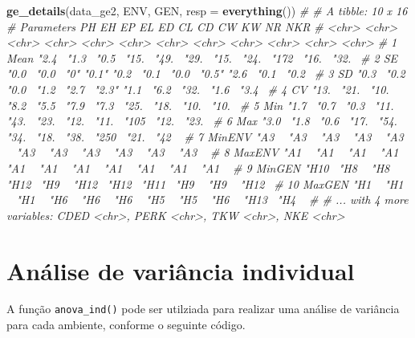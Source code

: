 \documentclass[
]{book}
\newenvironment{Shaded}{\begin{snugshade}}{\end{snugshade}}
\newcommand{\CommentTok}[1]{\textcolor[rgb]{0.56,0.35,0.01}{\textit{#1}}}
\newcommand{\DataTypeTok}[1]{\textcolor[rgb]{0.13,0.29,0.53}{#1}}
\newcommand{\KeywordTok}[1]{\textcolor[rgb]{0.13,0.29,0.53}{\textbf{#1}}}
\newcommand{\NormalTok}[1]{#1}
\begin{document}
\begin{Shaded}
\begin{Highlighting}[]
\KeywordTok{ge_details}\NormalTok{(data_ge2, ENV, GEN, }\DataTypeTok{resp =} \KeywordTok{everything}\NormalTok{())}
\CommentTok{# # A tibble: 10 x 16}
\CommentTok{#    Parameters PH    EH    EP    EL    ED    CL    CD    CW    KW    NR    NKR  }
\CommentTok{#    <chr>      <chr> <chr> <chr> <chr> <chr> <chr> <chr> <chr> <chr> <chr> <chr>}
\CommentTok{#  1 Mean       "2.4~ "1.3~ "0.5~ "15.~ "49.~ "29.~ "15.~ "24.~ "172~ "16.~ "32.~}
\CommentTok{#  2 SE         "0.0~ "0.0~ "0"   "0.1" "0.2~ "0.1~ "0.0~ "0.5" "2.6~ "0.1~ "0.2~}
\CommentTok{#  3 SD         "0.3~ "0.2~ "0.0~ "1.2~ "2.7~ "2.3" "1.1~ "6.2~ "32.~ "1.6~ "3.4~}
\CommentTok{#  4 CV         "13.~ "21.~ "10.~ "8.2~ "5.5~ "7.9~ "7.3~ "25.~ "18.~ "10.~ "10.~}
\CommentTok{#  5 Min        "1.7~ "0.7~ "0.3~ "11.~ "43.~ "23.~ "12.~ "11.~ "105~ "12.~ "23.~}
\CommentTok{#  6 Max        "3.0~ "1.8~ "0.6~ "17.~ "54.~ "34.~ "18.~ "38.~ "250~ "21.~ "42 ~}
\CommentTok{#  7 MinENV     "A3 ~ "A3 ~ "A3 ~ "A3 ~ "A3 ~ "A3 ~ "A3 ~ "A3 ~ "A3 ~ "A3 ~ "A3 ~}
\CommentTok{#  8 MaxENV     "A1 ~ "A1 ~ "A1 ~ "A1 ~ "A1 ~ "A1 ~ "A1 ~ "A1 ~ "A1 ~ "A1 ~ "A1 ~}
\CommentTok{#  9 MinGEN     "H10~ "H8 ~ "H8 ~ "H12~ "H9 ~ "H12~ "H12~ "H11~ "H9 ~ "H9 ~ "H12~}
\CommentTok{# 10 MaxGEN     "H1 ~ "H1 ~ "H1 ~ "H6 ~ "H6 ~ "H6 ~ "H5 ~ "H5 ~ "H6 ~ "H13~ "H4 ~}
\CommentTok{# # ... with 4 more variables: CDED <chr>, PERK <chr>, TKW <chr>, NKE <chr>}
\end{Highlighting}
\end{Shaded}

\hypertarget{anuxe1lise-de-variuxe2ncia-individual}{%
\section{Análise de variância individual}\label{anuxe1lise-de-variuxe2ncia-individual}}

A função \texttt{anova\_ind()}  pode ser utilziada para realizar uma análise de variância para cada ambiente, conforme o seguinte código.
\end{document}
